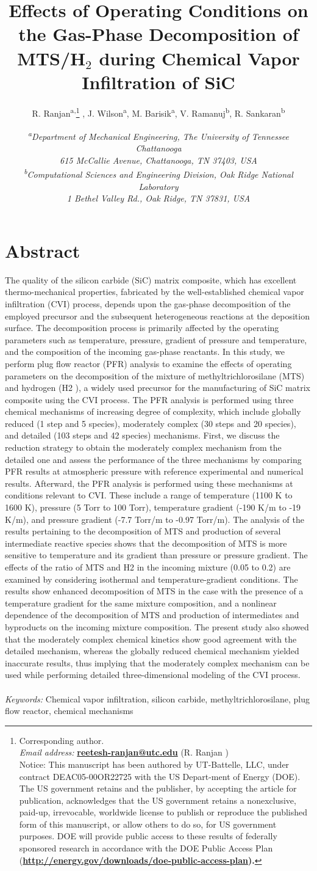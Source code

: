 \documentclass[10pt, letterpaper]{article}
\title{
    \Large 
        Effects of Operating Conditions on the Gas-Phase Decomposition of \\
        MTS/H$_2$ during Chemical Vapor Infiltration of SiC
    }
\author{
    {\normalsize
        R. Ranjan\textsuperscript{a,}\thanks{\footnotesize Corresponding author. \\ 
        \hspace*{12.5pt} \emph{Email address:} \textbf{\href{mailto:reetesh-ranjan@utc.edu}{reetesh-ranjan@utc.edu}} (R. Ranjan ) \\
        \hspace*{13pt} Notice: This manuscript has been authored by UT-Battelle, LLC, under contract DEAC05-00OR22725 with the US Depart-ment of Energy (DOE). The US government retains and the publisher, by accepting the article for publication, acknowledges that the US government retains a nonexclusive, paid-up, irrevocable, worldwide license to publish or reproduce the published form of this manuscript, or allow others to do so, for US government purposes. DOE will provide public access to these results of federally sponsored research in accordance with the DOE Public Access Plan (\bf \href{http://energy.gov/downloads/doe-public-access-plan}{http://energy.gov/downloads/doe-public-access-plan}).
} ,
        J. Wilson\textsuperscript{a},
        M. Barisik\textsuperscript{a},
        V. Ramanuj\textsuperscript{b},
        R. Sankaran\textsuperscript{b}
        }
    }
\date{
    \footnotesize 
        \emph{
            \textsuperscript{a}Department of Mechanical Engineering, The University of Tennessee Chattanooga \\
            615 McCallie Avenue, Chattanooga, TN 37403, USA \\
            \textsuperscript{b}Computational Sciences and Engineering Division, Oak Ridge National Laboratory \\
            1 Bethel Valley Rd., Oak Ridge, TN 37831, USA \\
        }
    }
\begin{document}
\maketitle
\noindent\hrulefill
\section*{Abstract}
The quality of the silicon carbide (SiC) matrix composite, which has excellent thermo-mechanical properties,
fabricated by the well-established chemical vapor infiltration (CVI) process, depends upon the gas-phase
decomposition of the employed precursor and the subsequent heterogeneous reactions at the deposition
surface. The decomposition process is primarily affected by the operating parameters such as temperature,
pressure, gradient of pressure and temperature, and the composition of the incoming gas-phase reactants. In
this study, we perform plug flow reactor (PFR) analysis to examine the effects of operating parameters on the
decomposition of the mixture of methyltrichlorosilane (MTS) and hydrogen (H2 ), a widely used precursor
for the manufacturing of SiC matrix composite using the CVI process. The PFR analysis is performed using
three chemical mechanisms of increasing degree of complexity, which include globally reduced (1 step and 5
species), moderately complex (30 steps and 20 species), and detailed (103 steps and 42 species) mechanisms.
First, we discuss the reduction strategy to obtain the moderately complex mechanism from the detailed
one and assess the performance of the three mechanisms by comparing PFR results at atmospheric pressure
with reference experimental and numerical results. Afterward, the PFR analysis is performed using these
mechanisms at conditions relevant to CVI. These include a range of temperature (1100 K to 1600 K), pressure
(5 Torr to 100 Torr), temperature gradient (-190 K/m to -19 K/m), and pressure gradient (-7.7 Torr/m to
-0.97 Torr/m). The analysis of the results pertaining to the decomposition of MTS and production of several
intermediate reactive species shows that the decomposition of MTS is more sensitive to temperature and
its gradient than pressure or pressure gradient. The effects of the ratio of MTS and H2 in the incoming
mixture (0.05 to 0.2) are examined by considering isothermal and temperature-gradient conditions. The
results show enhanced decomposition of MTS in the case with the presence of a temperature gradient for
the same mixture composition, and a nonlinear dependence of the decomposition of MTS and production
of intermediates and byproducts on the incoming mixture composition. The present study also showed that
the moderately complex chemical kinetics show good agreement with the detailed mechanism, whereas the
globally reduced chemical mechanism yielded inaccurate results, thus implying that the moderately complex
mechanism can be used while performing detailed three-dimensional modeling of the CVI process.
\\
\\
\noindent\emph{Keywords:} Chemical vapor infiltration, silicon carbide, methyltrichlorosilane, plug flow reactor, chemical mechanisms
\end{document}
